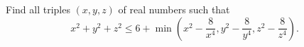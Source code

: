 Find all triples $(x,y,z)$ of real numbers such that
\[x^2+y^2+z^2\le 6+\min (x^2-\frac{8}{x^4},y^2-\frac{8}{y^4},z^2-\frac{8}{z^4}).\]